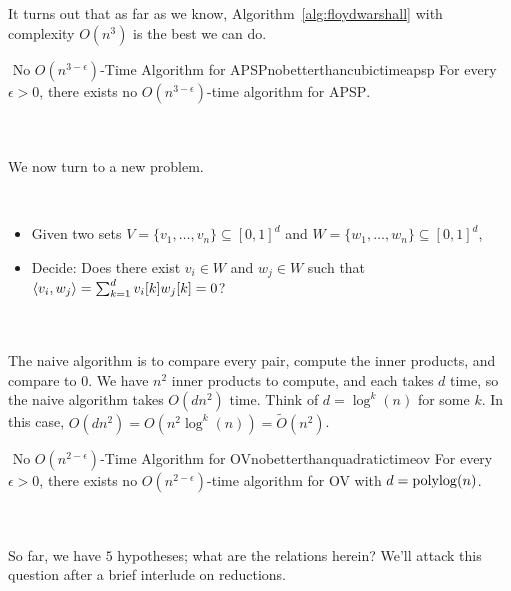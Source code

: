        \vphantom
        \\
        \\
        It turns out that as far as we know, Algorithm~\ref{alg:floydwarshall} with complexity \(O(n^3)\) is the best we can do.
        \begin{hypothesis}{\Stop\,\,No \(O(n^{3-\epsilon})\)-Time Algorithm for \textsc{APSP}}{nobetterthancubictimeapsp}
            For every \(\epsilon>0\), there exists no \(O(n^{3-\epsilon})\)-time algorithm for \textsc{APSP}.
        \end{hypothesis}
        \pagebreak
        \vphantom
        \\
        \\
        We now turn to a new problem.
        \begin{compprob} \label{prob:ov}
            \vphantom
            \\
            \begin{itemize}
                \item Given two sets \(V=\{v_1,\ldots,v_n\}\subseteq[0,1]^d\) and \(W=\{w_1,\ldots,w_n\}\subseteq[0,1]^d\),
                \item Decide: Does there exist \(v_i\in W\) and \(w_j\in W\) such that \(\left\langle v_i,w_j\right\rangle=\sum_{k=1}^d v_i[k]w_j[k]=0\)?
            \end{itemize}
        \end{compprob}
        \vphantom
        \\
        \\
        The naive algorithm is to compare every pair, compute the inner products, and compare to \(0\). We have \(n^2\) inner products to compute, and each takes \(d\) time, so the naive algorithm takes \(O(dn^2)\) time. Think of \(d=\log^k(n)\) for some \(k\). In this case, \(O(dn^2)=O(n^2\log^k(n))=\tilde{O}(n^2)\).
        \begin{hypothesis}{\Stop\,\,No \(O(n^{2-\epsilon})\)-Time Algorithm for \textsc{OV}}{nobetterthanquadratictimeov}
            For every \(\epsilon>0\), there exists no \(O(n^{2-\epsilon})\)-time algorithm for \textsc{OV} with \(d=\operatorname{polylog}(n)\).
        \end{hypothesis}
        \vphantom
        \\
        \\
        So far, we have \(5\) hypotheses; what are the relations herein? We'll attack this question after a brief interlude on reductions.
        \\
